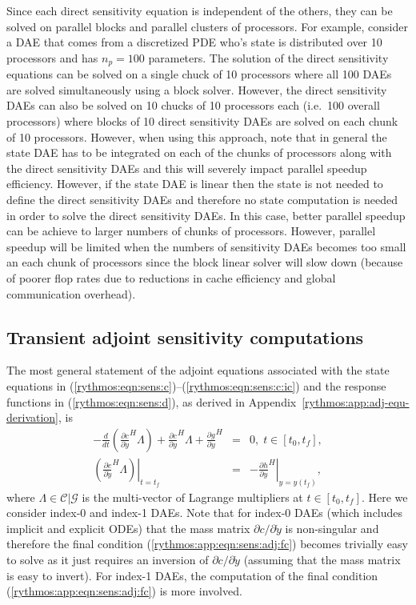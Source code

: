 \documentclass[pdf,ps2pdf,11pt]{SANDreport}
\begin{document}
Since each direct sensitivity equation is independent of the others, they can
be solved on parallel blocks and parallel clusters of processors.  For
example, consider a DAE that comes from a discretized PDE who's state is
distributed over 10 processors and has $n_p=100$ parameters.  The solution of
the direct sensitivity equations can be solved on a single chuck of 10
processors where all 100 DAEs are solved simultaneously using a block solver.
However, the direct sensitivity DAEs can also be solved on 10 chucks of 10
processors each (i.e.\ 100 overall processors) where blocks of 10 direct
sensitivity DAEs are solved on each chunk of 10 processors.  However, when
using this approach, note that in general the state DAE has to be integrated
on each of the chunks of processors along with the direct sensitivity DAEs and
this will severely impact parallel speedup efficiency.  However, if the state
DAE is linear then the state is not needed to define the direct sensitivity
DAEs and therefore no state computation is needed in order to solve the direct
sensitivity DAEs.  In this case, better parallel speedup can be achieve to
larger numbers of chunks of processors.  However, parallel speedup will be
limited when the numbers of sensitivity DAEs becomes too small an each chunk
of processors since the block linear solver will slow down (because of poorer
flop rates due to reductions in cache efficiency and global communication
overhead).

\subsection{Transient adjoint sensitivity computations}

The most general statement of the adjoint equations associated with the state
equations in (\ref{rythmos:eqn:sens:c})--(\ref{rythmos:eqn:sens:c:ic}) and the
response functions in (\ref{rythmos:eqn:sens:d}), as derived in
Appendix~\ref{rythmos:app:adj-equ-derivation}, is
%
\begin{eqnarray}
- \frac{d}{dt}\left( \frac{\partial c}{\partial \dot{y}}^H \Lambda \right)
+  \frac{\partial c}{\partial y}^H \Lambda + \frac{\partial g}{\partial y}^H
& = & 0, \; t \in \left[ t_0, t_f \right],
\label{rythmos:app:eqn:sens:adj} \\
\left.\left( \frac{\partial c}{\partial \dot{y}}^H \Lambda \right)\right|_{t=t_f}
& = & - \left. \frac{\partial h}{\partial y}^H \right|_{y=y(t_f)},
\label{rythmos:app:eqn:sens:adj:fc}
\end{eqnarray}
%
where $\Lambda\in\mathcal{C}|\mathcal{G}$ is the multi-vector of Lagrange
multipliers at $t\in[t_0,t_f]$.  Here we consider index-0 and index-1 DAEs.
Note that for index-0 DAEs (which includes implicit and explicit ODEs) that
the mass matrix $\partial c / {}\partial {}\dot{y}$ is non-singular and
therefore the final condition (\ref{rythmos:app:eqn:sens:adj:fc}) becomes
trivially easy to solve as it just requires an inversion of $\partial c /
{}\partial {}\dot{y}$ (assuming that the mass matrix is easy to invert).  For
index-1 DAEs, the computation of the final condition
(\ref{rythmos:app:eqn:sens:adj:fc}) is more involved.
\end{document}
